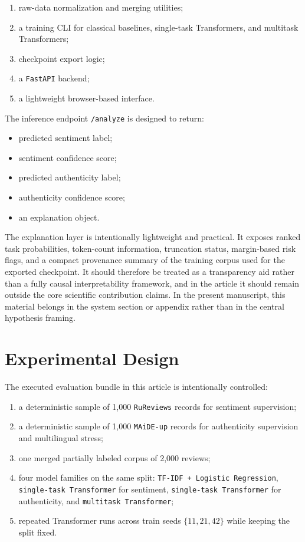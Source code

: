 \documentclass[12pt,a4paper]{article}
\begin{document}
\begin{enumerate}[label=\arabic*.]
  \item raw-data normalization and merging utilities;
  \item a training CLI for classical baselines, single-task Transformers, and multitask Transformers;
  \item checkpoint export logic;
  \item a \texttt{FastAPI} backend;
  \item a lightweight browser-based interface.
\end{enumerate}

The inference endpoint \texttt{/analyze} is designed to return:

\begin{itemize}[leftmargin=1.5cm]
  \item predicted sentiment label;
  \item sentiment confidence score;
  \item predicted authenticity label;
  \item authenticity confidence score;
  \item an explanation object.
\end{itemize}

The explanation layer is intentionally lightweight and practical. It exposes ranked task probabilities, token-count information, truncation status, margin-based risk flags, and a compact provenance summary of the training corpus used for the exported checkpoint. It should therefore be treated as a transparency aid rather than a fully causal interpretability framework, and in the article it should remain outside the core scientific contribution claims. In the present manuscript, this material belongs in the system section or appendix rather than in the central hypothesis framing.

\section{Experimental Design}

The executed evaluation bundle in this article is intentionally controlled:

\begin{enumerate}[label=\arabic*.]
  \item a deterministic sample of 1{,}000 \texttt{RuReviews} records for sentiment supervision;
  \item a deterministic sample of 1{,}000 \texttt{MAiDE-up} records for authenticity supervision and multilingual stress;
  \item one merged partially labeled corpus of 2{,}000 reviews;
  \item four model families on the same split: \texttt{TF-IDF + Logistic Regression}, \texttt{single-task Transformer} for sentiment, \texttt{single-task Transformer} for authenticity, and \texttt{multitask Transformer};
  \item repeated Transformer runs across train seeds $\{11,21,42\}$ while keeping the split fixed.
\end{enumerate}
\end{document}
